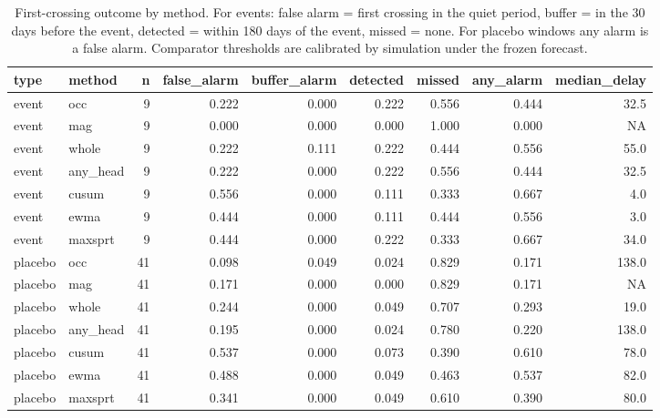 \begin{table}

\caption{First-crossing outcome by method. For events: false alarm = first crossing in the quiet period, buffer = in the 30 days before the event, detected = within 180 days of the event, missed = none. For placebo windows any alarm is a false alarm. Comparator thresholds are calibrated by simulation under the frozen forecast.}
\centering
\begin{tabular}[t]{llrrrrrrr}
\toprule
type & method & n & false\_alarm & buffer\_alarm & detected & missed & any\_alarm & median\_delay\\
\midrule
event & occ & 9 & 0.222 & 0.000 & 0.222 & 0.556 & 0.444 & 32.5\\
event & mag & 9 & 0.000 & 0.000 & 0.000 & 1.000 & 0.000 & NA\\
event & whole & 9 & 0.222 & 0.111 & 0.222 & 0.444 & 0.556 & 55.0\\
event & any\_head & 9 & 0.222 & 0.000 & 0.222 & 0.556 & 0.444 & 32.5\\
event & cusum & 9 & 0.556 & 0.000 & 0.111 & 0.333 & 0.667 & 4.0\\
\addlinespace
event & ewma & 9 & 0.444 & 0.000 & 0.111 & 0.444 & 0.556 & 3.0\\
event & maxsprt & 9 & 0.444 & 0.000 & 0.222 & 0.333 & 0.667 & 34.0\\
placebo & occ & 41 & 0.098 & 0.049 & 0.024 & 0.829 & 0.171 & 138.0\\
placebo & mag & 41 & 0.171 & 0.000 & 0.000 & 0.829 & 0.171 & NA\\
placebo & whole & 41 & 0.244 & 0.000 & 0.049 & 0.707 & 0.293 & 19.0\\
\addlinespace
placebo & any\_head & 41 & 0.195 & 0.000 & 0.024 & 0.780 & 0.220 & 138.0\\
placebo & cusum & 41 & 0.537 & 0.000 & 0.073 & 0.390 & 0.610 & 78.0\\
placebo & ewma & 41 & 0.488 & 0.000 & 0.049 & 0.463 & 0.537 & 82.0\\
placebo & maxsprt & 41 & 0.341 & 0.000 & 0.049 & 0.610 & 0.390 & 80.0\\
\bottomrule
\end{tabular}
\end{table}
